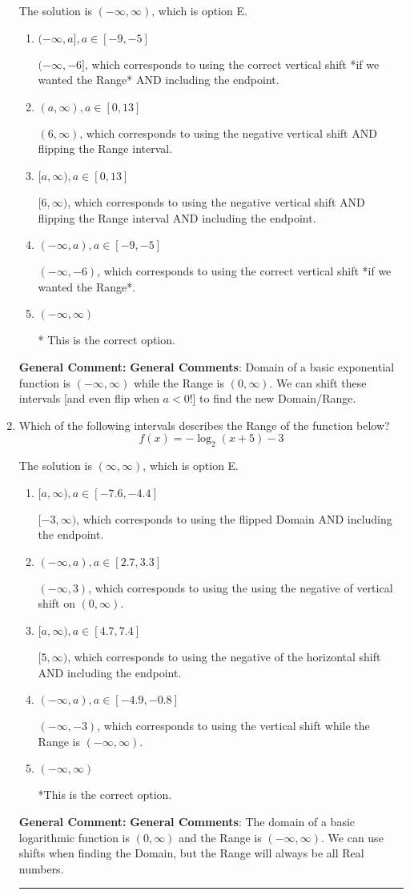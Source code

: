 \documentclass{extbook}[14pt]
\newcommand{\litem}[1]{\item #1

\rule{\textwidth}{0.4pt}}
\begin{document}
\begin{enumerate}
{The solution is \( (-\infty, \infty) \), which is option E.\begin{enumerate}[label=\Alph*.]
\item \( (-\infty, a], a \in [-9, -5] \)

$(-\infty, -6]$, which corresponds to using the correct vertical shift *if we wanted the Range* AND including the endpoint.
\item \( (a, \infty), a \in [0, 13] \)

$(6, \infty)$, which corresponds to using the negative vertical shift AND flipping the Range interval.
\item \( [a, \infty), a \in [0, 13] \)

$[6, \infty)$, which corresponds to using the negative vertical shift AND flipping the Range interval AND including the endpoint.
\item \( (-\infty, a), a \in [-9, -5] \)

$(-\infty, -6)$, which corresponds to using the correct vertical shift *if we wanted the Range*.
\item \( (-\infty, \infty) \)

* This is the correct option.
\end{enumerate}

\textbf{General Comment:} \textbf{General Comments}: Domain of a basic exponential function is $(-\infty, \infty)$ while the Range is $(0, \infty)$. We can shift these intervals [and even flip when $a<0$!] to find the new Domain/Range.
}
\litem{
Which of the following intervals describes the Range of the function below?
\[ f(x) = -\log_2{(x+5)}-3 \]

The solution is \( (\infty, \infty) \), which is option E.\begin{enumerate}[label=\Alph*.]
\item \( [a, \infty), a \in [-7.6, -4.4] \)

$[-3, \infty)$, which corresponds to using the flipped Domain AND including the endpoint.
\item \( (-\infty, a), a \in [2.7, 3.3] \)

$(-\infty, 3)$, which corresponds to using the using the negative of vertical shift on $(0, \infty)$.
\item \( [a, \infty), a \in [4.7, 7.4] \)

$[5, \infty)$, which corresponds to using the negative of the horizontal shift AND including the endpoint.
\item \( (-\infty, a), a \in [-4.9, -0.8] \)

$(-\infty, -3)$, which corresponds to using the vertical shift while the Range is $(-\infty, \infty)$.
\item \( (-\infty, \infty) \)

*This is the correct option.
\end{enumerate}

\textbf{General Comment:} \textbf{General Comments}: The domain of a basic logarithmic function is $(0, \infty)$ and the Range is $(-\infty, \infty)$. We can use shifts when finding the Domain, but the Range will always be all Real numbers.
}
\end{enumerate}
\end{document}

